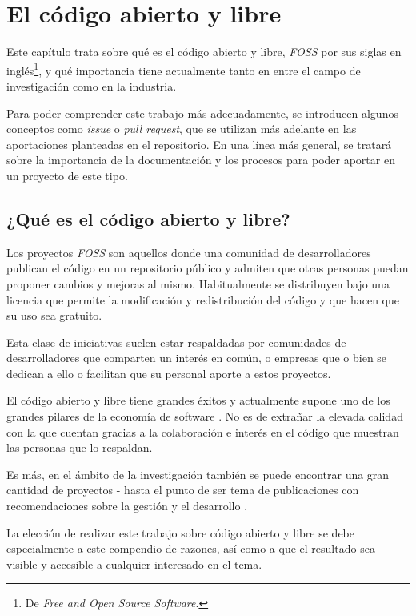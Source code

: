 \chapter{El código abierto y libre} \label{chp:FOSS}

Este capítulo trata sobre qué es el código abierto y libre, \textit{\gls{FOSS}} por sus siglas en inglés\footnote{De \textit{Free and Open Source Software}.}, y qué importancia tiene actualmente tanto en entre el campo de investigación como en la industria.

Para poder comprender este trabajo más adecuadamente, se introducen algunos conceptos como \textit{\gls{issue}} o \textit{\gls{pull request}}, que se utilizan más adelante en las aportaciones planteadas en el \gls{repositorio}. En una línea más general, se tratará sobre la importancia de la \gls{documentación} y los procesos para poder aportar en un proyecto de este tipo.

\section{¿Qué es el código abierto y libre?} \label{sct:que_es_FOSS}

Los proyectos \textit{\gls{FOSS}} son aquellos donde una comunidad de desarrolladores publican el código en un \gls{repositorio} público y admiten que otras personas puedan proponer cambios y mejoras al mismo. Habitualmente se distribuyen bajo una \gls{licencia} que permite la modificación y redistribución del código y que hacen que su uso sea gratuito.

Esta clase de iniciativas suelen estar respaldadas por comunidades de desarrolladores que comparten un interés en común, o empresas que o bien se dedican a ello o facilitan que su personal aporte a estos proyectos.

El código abierto y libre tiene grandes éxitos y actualmente supone uno de los grandes pilares de la economía de \gls{software} \cite{dibona1999open, a556016d-4d87-3a33-80d5-87839d42cc50}. No es de extrañar la elevada calidad con la que cuentan \cite{Alenezi_Abunadi_2015} gracias a la colaboración e interés en el código que muestran las personas que lo respaldan.

Es más, en el ámbito de la investigación también se puede encontrar una gran cantidad de proyectos - hasta el punto de ser tema de publicaciones con recomendaciones sobre la gestión y el desarrollo \cite{10.1145/3472749.3474819}.

La elección de realizar este trabajo sobre código abierto y libre se debe especialmente a este compendio de razones, así como a que el resultado sea visible y accesible a cualquier interesado en el tema.

